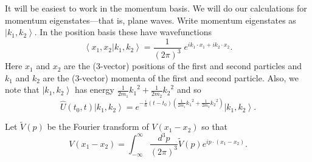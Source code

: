 \documentclass[11pt]{article}
\newcommand{\ket}[1]{\left|#1\right\rangle}
\newcommand{\braket}[2]{\left\langle#1|#2\right\rangle}
\newcommand{\op}[1]{\hat{#1}}
\theoremstyle{theorem}
\theoremstyle{remark}
\theoremstyle{step}
\theoremstyle{gap}
\begin{document}
It will be easiest to work in the momentum basis. We will do our calculations for momentum eigenstates---that is, plane waves. Write momentum eigenstates as \(\ket{k_1, k_2}\). In the position basis these have wavefunctions
\begin{equation}\label{eq.momentuminpos}
\braket{x_1, x_2}{k_1, k_2} = \frac{1}{(2\pi)^3}\;e^{ik_1\cdot x_1 + ik_2\cdot x_2}.
\end{equation}
Here \(x_1\) and \(x_2\) are the (3-vector) positions of the first and second particles and \(k_1\) and \(k_2\) are the (3-vector) momenta of the first and second particle. Also, we note that \(\ket{k_1, k_2}\) has energy \(\frac{1}{2m_1}{k_1}^2 + \frac{1}{2m_2}{k_2}^2\) and so
\begin{equation}
\label{eq.timeevonk}
\op{U}(t_0, t) \ket{k_1, k_2} = e^{-\frac{i}{\hbar}\left(t-t_0\right)\left(\frac{1}{2m_1}{k_1}^2 + \frac{1}{2m_2}{k_2}^2\right)} \ket{k_1, k_2}.
\end{equation}

Let \(\widetilde{V}(p)\) be the Fourier transform of \(V(x_1 - x_2)\) so that
\begin{equation}
\label{eq.ftV}
V(x_1 - x_2) = \int_{-\infty}^{\infty} \frac{d^3 p}{(2 \pi)^3} \widetilde{V}(p) e^{ip\cdot(x_1 - x_2)}.
\end{equation}
\end{document}
